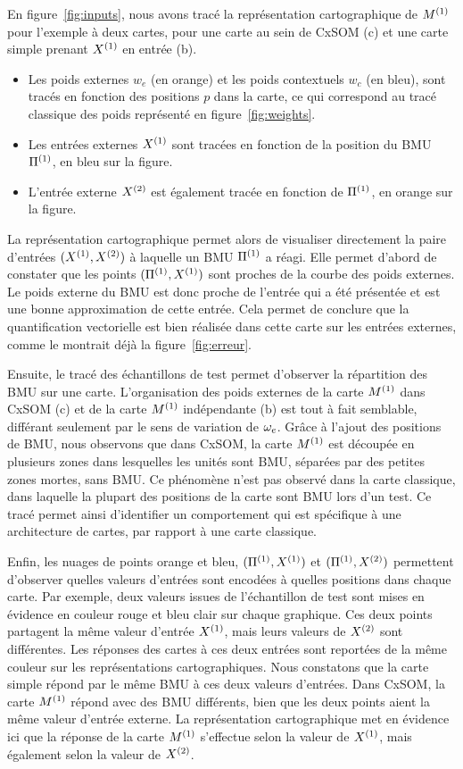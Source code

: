 \documentclass[../main]{subfiles}
\begin{document}
En figure~\ref{fig:inputs}, nous avons tracé la représentation cartographique de $M^{({1})}$ pour l'exemple à deux cartes, pour une carte au sein de CxSOM (c) et une carte simple prenant $X^{({1})}$ en entrée (b).
\begin{itemize}
    \item Les poids externes $w_e$ (en orange) et les poids contextuels $w_c$ (en bleu), sont tracés en fonction des positions $p$ dans la carte, ce qui correspond au tracé classique des poids représenté en figure~\ref{fig:weights}.
    \item Les entrées externes $X^{({1})}$ sont tracées en fonction de la position du BMU $\Pi^{({1})}$, en bleu sur la figure.
    \item L'entrée externe $X^{({2})}$ est également tracée en fonction de $\Pi^{({1})}$, en orange sur la figure. 
\end{itemize}

La représentation cartographique permet alors de visualiser directement la paire d'entrées $(X^{({1})}, X^{({2})})$ à laquelle un BMU $\Pi^{({1})}$ a réagi.
Elle permet d'abord de constater que les points $(\Pi^{({1})},X^{({1})})$ sont proches de la courbe des poids externes. Le poids externe du BMU est donc proche de l'entrée qui a été présentée et est une bonne approximation de cette entrée. 
Cela permet de conclure que la quantification vectorielle est bien réalisée dans cette carte sur les entrées externes, comme le montrait déjà la figure~\ref{fig:erreur}.

Ensuite, le tracé des échantillons de test permet d'observer la répartition des BMU sur une carte. 
L'organisation des poids externes de la carte $M^{({1})}$ dans CxSOM (c) et de la carte $M^{({1})}$ indépendante (b) est tout à fait semblable, différant seulement par le sens de variation de $\omega_e$.
Grâce à l'ajout des positions de BMU, nous observons que dans CxSOM, la carte $M^{({1})}$ est découpée en plusieurs zones dans lesquelles les unités sont BMU, séparées par des petites zones mortes, sans BMU. Ce phénomène n'est pas observé dans la carte classique, dans laquelle la plupart des positions de la carte sont BMU lors d'un test. 
Ce tracé permet ainsi d'identifier un comportement qui est spécifique à une architecture de cartes, par rapport à une carte classique. 

Enfin, les nuages de points orange et bleu, $(\Pi^{({1})},X^{({1})})$ et $(\Pi^{({1})},X^{({2})})$ permettent d'observer quelles valeurs d'entrées sont encodées à quelles positions dans chaque carte.
Par exemple, deux valeurs issues de l'échantillon de test sont mises en évidence en couleur rouge et bleu clair sur chaque graphique.
Ces deux points partagent la même valeur d'entrée $X^{({1})}$, mais leurs valeurs de $X^{({2})}$ sont différentes. Les réponses des cartes à ces deux entrées sont reportées de la même couleur sur les représentations cartographiques. Nous constatons que la carte simple répond par le même BMU à ces deux valeurs d'entrées. Dans CxSOM, la carte $M^{({1})}$ répond avec des BMU différents, bien que les deux points aient la même valeur d'entrée externe. La représentation cartographique met en évidence ici que la réponse de la carte $M^{({1})}$ s'effectue selon la valeur de $X^{({1})}$, mais également selon la valeur de $X^{({2})}$. 
\end{document}
